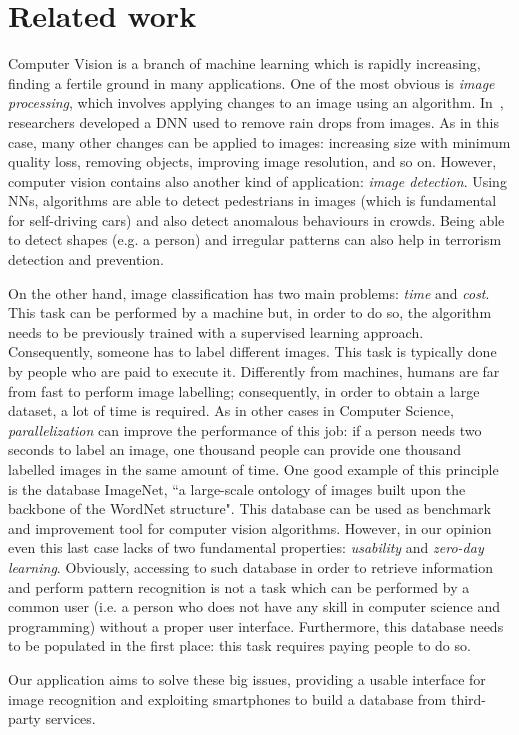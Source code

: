 \section{Related work}
\label{sec:related}

Computer Vision is a branch of machine learning which is rapidly increasing, 
finding a fertile ground in many applications. One of the most obvious is 
\textit{image processing}, which involves applying changes to an image using an 
algorithm. In~\cite{Rain}, researchers developed a DNN used to remove rain drops 
from images. As in this case, many other changes can be applied to images: 
increasing size with minimum quality loss, removing objects, improving image 
resolution, and so on. However, computer vision contains also another kind of 
application: \textit{image detection}. Using NNs, algorithms are able to detect 
pedestrians in images\cite{Pedestrian} (which is fundamental for self-driving 
cars) and also detect anomalous behaviours in crowds\cite{Crowd}. Being able to 
detect shapes (e.g. a person) and irregular patterns can also help in terrorism 
detection and prevention.

On the other hand, image classification has two main problems: \textit{time} and 
\textit{cost}. This task can be performed by a machine but, in order to do so, 
the algorithm needs to be previously trained with a supervised learning 
approach. Consequently, someone has to label different images. This task is typically 
done by people who are paid to execute it. Differently from machines, humans are 
far from fast to perform image labelling; consequently, in order to obtain a 
large dataset, a lot of time is required.
As in other cases in Computer Science, \textit{parallelization} can improve the 
performance of this job: if a person needs two seconds to label an image, one 
thousand people can provide one thousand labelled images in the same amount of 
time. One good example of this principle is the database 
ImageNet\cite{ImageNet2}, ``a large-scale ontology of images built upon the 
backbone of the WordNet structure"\cite{ImageNet1}. This database can be used as 
benchmark and improvement tool for computer vision algorithms.
However, in our opinion even this last case lacks of two fundamental 
properties: \textit{usability} and \textit{zero-day learning}. Obviously, 
accessing to such database in order to retrieve information and perform pattern 
recognition is not a task which can be performed by a common user (i.e. a person 
who does not have any skill in computer science and programming) without a proper user 
interface. Furthermore, this database needs to be populated in the first place: 
this task requires paying people to do so.

Our application aims to solve these big issues, providing a usable interface for 
image recognition and exploiting smartphones to build a database from third-party 
services.
